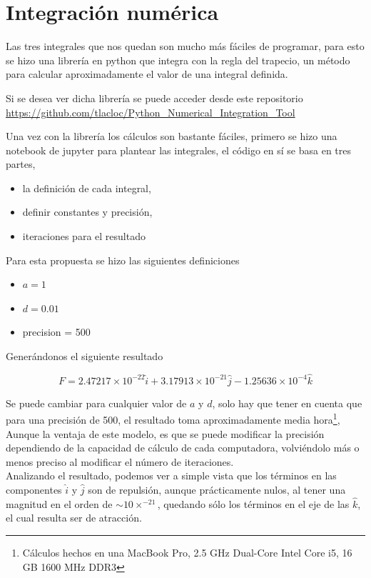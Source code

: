 \documentclass[11pt]{report}
\theoremstyle{plain}
\theoremstyle{definition}
\begin{document}
	\section*{Integración numérica}
	
	Las tres integrales que nos quedan son mucho más fáciles de programar, para esto se hizo una librería en python que integra con la regla del trapecio, un método para calcular aproximadamente el valor de una integral definida.
	
	Si se desea ver dicha librería se puede acceder desde este repositorio \url{https://github.com/tlacloc/Python_Numerical_Integration_Tool}
	
	Una vez con la librería los cálculos son bastante fáciles, primero se hizo una notebook de jupyter para plantear las integrales, el código en sí se basa en tres partes, 
	\begin{itemize}
		\item la definición de cada integral,
		\item definir constantes y precisión,
		\item iteraciones para el resultado
	\end{itemize}  

	
	Para esta propuesta se hizo las siguientes definiciones
	\begin{itemize}
		\item $a = 1$
		\item $d = 0.01$
		\item precision = 500
	\end{itemize}
	
	
	Generándonos el siguiente resultado
	
	\begin{equation*}
		F = 2.47217\times 10^{-22}\hat{i} + 3.17913\times 10^{-21}\hat{j} - 1.25636\times 10^{-4}\hat{k}
	\end{equation*}
	
	
	Se puede cambiar para cualquier valor de $a$ y $d$, solo hay que tener en cuenta que para una precisión de 500, el resultado toma aproximadamente media hora\footnote{Cálculos hechos en una MacBook Pro, 2.5 GHz Dual-Core Intel Core i5, 16 GB 1600 MHz DDR3}, Aunque la ventaja de este modelo, es que se puede modificar la precisión dependiendo de la capacidad de cálculo de cada computadora, volviéndolo más o menos preciso al modificar el número de iteraciones.\\
	
	Analizando el resultado, podemos ver a simple vista que los términos en las componentes $\hat{i}$ y $\hat{j}$ son de repulsión, aunque prácticamente nulos, al tener una magnitud en el orden de $\sim 10\times^{-21}$, quedando sólo los términos en el eje de las $\hat{k}$, el cual resulta ser de atracción.

\end{document}
